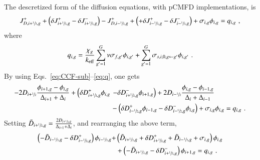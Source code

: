 \documentclass[review,3p,onecolumn,sort&compress]{elsarticle}
\newcommand{\eq}[1]{Eq.~(\ref{#1})}
\newcommand{\keff}{\ensuremath{k_{\textrm{\scriptsize{eff}}}}}
\newcommand{\jp}{\ensuremath{J^+}}
\newcommand{\jm}{\ensuremath{J^-}}
\newcommand{\delj}{\ensuremath{\delta J}}
\newcommand{\jD}{\ensuremath{J^{\textrm{\scriptsize{D}}}}}
\newcommand{\hzi}{\ensuremath{\sfrac{1}{2}}}
\newcommand{\dx}{\Delta}
\newcommand{\dd}{\delta D}
\newcommand{\tild}{\tilde{D}}
\begin{document}
The descretized form of the diffusion equations, with pCMFD implementations, is
\begin{equation}
	\label{eq:pCMFD-diff1}
	J_{D,i+\hzi,g}^+ +\left( \delj_{i+\hzi,g}^+ - \delj_{i+\hzi,g}^- \right) - J_{D,i-\hzi,g}^+ + \left( + \delj_{i-\hzi,g}^+ - 
	\delj_{i-\hzi,g}^- \right) + \sigma_{i,g}\phi_{i,g} = q_{i,g}\,\,,
\end{equation}
where
\begin{equation}
	\label{eq:q}
	q_{i,g} = \frac{\chi_g}{\keff}\sum\limits^G_{g'=1}\nu\sigma_{f,g'}\phi_{i,g'} + \sum\limits_{g'=1}^G \sigma_{s,i,0,g\leftarrow g'}\phi_{i,g'}\,\,.
\end{equation}
By using Eqs.~\eqref{eq:CCF-sub}--\eqref{eq:q}, one gets
\begin{equation}
	\label{eq:pCMFD-diff2}
	\begin{split}
	-2D_{i+\hzi}\frac{\phi_{i+1,g} - \phi_{i,g}}{\dx_{i+1}+\dx_{i}} +\left( \dd^+_{i+\hzi,g}\phi_{i,g} \right.&\left. - \dd^-_{i+\hzi,g }\phi_{i+1,g}\right)
	+2D_{i-\hzi}\frac{\phi_{i,g} - \phi_{i-1,g}}{\dx_{i}+\dx_{i-1}} \\ 
	&- \left( \dd^+_{i-\hzi,g}\phi_{i-1,g} -\dd^-_{i-\hzi,g}\phi_{i,g}\right) +\sigma_{i,g}\phi_{i,g} = q_{i,g}\,\,.
	\end{split}
\end{equation}
Setting $\tild_{i+\hzi,g} = \frac{2D_{i+\hzi,g}}{\dx_{i+1}+\dx_{i}}$, and rearranging the above term, 
\begin{equation}
	\label{eq:pCMFD-rearrange}
	\begin{split}
	\left(-\tild_{i-\hzi,g}-\dd^+_{i-\hzi,g}\right)\phi_{i-\hzi,g} + &\left( \tild_{i+\hzi,g} + \dd^+_{i+\hzi,g}+ \tild_{i-\hzi,g} + \sigma_{i,g}\right)\phi_{i,g} \\
	&+ \left( -\tild_{i+\hzi,g} - \dd^-_{i+\hzi,g}\right)\phi_{i+1,g} = q_{i,g}\,\,.
	\end{split}
\end{equation}
\end{document}
